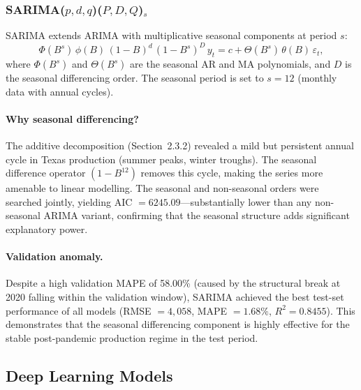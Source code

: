 \documentclass[12pt,a4paper]{article}
\begin{document}
\subsubsection{SARIMA($p,d,q$)($P,D,Q$)$_s$}

SARIMA extends ARIMA with multiplicative seasonal components at period $s$:
\begin{equation}
  \Phi(B^s)\,\phi(B)\,(1-B)^d\,(1-B^s)^D\,y_t = c + \Theta(B^s)\,\theta(B)\,\varepsilon_t,
  \label{eq:sarima}
\end{equation}
where $\Phi(B^s)$ and $\Theta(B^s)$ are the seasonal AR and MA polynomials, and $D$ is the seasonal differencing order. The seasonal period is set to $s = 12$ (monthly data with annual cycles).

\paragraph{Why seasonal differencing?}
The additive decomposition (Section~2.3.2) revealed a mild but persistent annual cycle in Texas production (summer peaks, winter troughs). The seasonal difference operator $(1-B^{12})$ removes this cycle, making the series more amenable to linear modelling. The seasonal and non-seasonal orders were searched jointly, yielding AIC $= 6245.09$---substantially lower than any non-seasonal ARIMA variant, confirming that the seasonal structure adds significant explanatory power.

\paragraph{Validation anomaly.}
Despite a high validation MAPE of 58.00\% (caused by the structural break at 2020 falling within the validation window), SARIMA achieved the best test-set performance of all models (RMSE $= 4{,}058$, MAPE $= 1.68\%$, $R^2 = 0.8455$). This demonstrates that the seasonal differencing component is highly effective for the stable post-pandemic production regime in the test period.

\subsection{Deep Learning Models}
\end{document}
